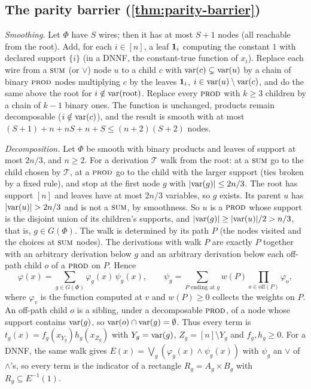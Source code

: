 \subsection{The parity barrier (\cref{thm:parity-barrier})}

\emph{Smoothing.} Let $\Phi$ have $S$ wires; then it has at most $S+1$ nodes (all
reachable from the root). Add, for each $i\in[n]$, a leaf $\mathbf{1}_i$ computing the
constant $1$ with declared support $\{i\}$ (in a DNNF, the constant-true function of
$x_i$). Replace each wire from a $\textsc{sum}$ (or $\vee$) node $u$ to a child $c$ with
$\mathrm{var}(c)\subsetneq\mathrm{var}(u)$ by a chain of binary $\textsc{prod}$ nodes multiplying $c$ by the
leaves $\mathbf{1}_i$, $i\in\mathrm{var}(u)\setminus\mathrm{var}(c)$, and do the same above the root for
$i\notin\mathrm{var}(\mathrm{root})$. Replace every $\textsc{prod}$ with $k\ge3$ children by a chain of
$k-1$ binary ones. The function is unchanged, products remain decomposable
($i\notin\mathrm{var}(c)$), and the result is smooth with at most
$(S+1)+n+nS+n+S\le(n+2)(S+2)$ nodes.

\emph{Decomposition.} Let $\Phi$ be smooth with binary products and leaves of support
at most $2n/3$, and $n\ge2$. For a derivation $\mathcal T$ walk from the root: at a
$\textsc{sum}$ go to the child chosen by $\mathcal T$, at a $\textsc{prod}$ go to the child with the
larger support (ties broken by a fixed rule), and stop at the first node $g$ with
$|\mathrm{var}(g)|\le2n/3$. The root has support $[n]$ and leaves have at most $2n/3$
variables, so $g$ exists. Its parent $u$ has $|\sv(u)|>2n/3$ and is not a $\textsc{sum}$, by
smoothness. So $u$ is a $\textsc{prod}$ whose support is the disjoint union of its children's
supports, and $|\mathrm{var}(g)|\ge|\mathrm{var}(u)|/2>n/3$, that is, $g\in G(\Phi)$. The walk is
determined by its path $P$ (the nodes visited and the choices at $\textsc{sum}$ nodes). The
derivations with walk $P$ are exactly $P$ together with an arbitrary derivation below
$g$ and an arbitrary derivation below each off-path child $o$ of a $\textsc{prod}$ on $P$.
Hence
\[
\varphi(x)=\sum_{g\in G(\Phi)}\varphi_g(x)\,\psi_g(x),\qquad
\psi_g=\sum_{P\text{ ending at }g}w(P)\prod_{o\in\mathrm{off}(P)}\varphi_o,
\]
where $\varphi_v$ is the function computed at $v$ and $w(P)\ge0$ collects the weights
on $P$. An off-path child $o$ is a sibling, under a decomposable $\textsc{prod}$, of a node
whose support contains $\mathrm{var}(g)$, so $\mathrm{var}(o)\cap\mathrm{var}(g)=\emptyset$. Thus every term is
$t_g(x)=f_g(x_{Y_g})h_g(x_{Z_g})$ with $Y_g=\mathrm{var}(g)$, $Z_g=[n]\setminus Y_g$ and
$f_g,h_g\ge0$. For a DNNF, the same walk gives
$E(x)=\bigvee_{g}(\varphi_g(x)\wedge\psi_g(x))$ with $\psi_g$ an $\vee$ of $\wedge$'s,
so every term is the indicator of a rectangle $R_g=A_g\times B_g$ with $R_g\subseteq
E^{-1}(1)$.

